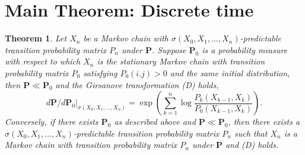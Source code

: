 \documentclass{lms}
\newtheorem{theorem}{Theorem}[section] %
\begin{document}
\section{Main Theorem: Discrete time}

\begin{theorem}
    Let $X_{n}$ be a Markov chain with $\sigma(X_{0},X_{1},\dots, X_{n})$-predictable transition probability matrix $P_n$ under $\mathbf P$. Suppose $\mathbf{P}_{0}$ is a probability measure with respect to which $X_{n}$ is the stationary Markov chain with transition probability matrix $P_0$ satisfying $P_{0}(i.j) >0$ and the same initial distribution, then $\mathbf{P} \ll \mathbf{P}_{0}$ and the Girsanove transformation (D) holds,
    \begin{equation*}   \left.d\mathbf{P}/d\mathbf{P}_{0}\right|_{\sigma(X_{0},X_{1},\dots, X_{n})}=  %
    \exp\left(\sum_{k=1}^{n} \log \frac{P_{k}(X_{k-1},X_{k})}{P_{0}(X_{k-1},X_{k})}
    \right). \tag{D}    \end{equation*}
    Conversely, if there exists $\mathbf{P}_{0}$ as described above and $\mathbf{P}\ll \mathbf{P}_{0}$, then there exists a $\sigma(X_{0},X_{1},\dots,X_{n})$-predictable transition probability matrix $P_n$ such that $X_n$ is a Markov chain with transition probability matrix $P_n$ under $\mathbf P$ and (D) holds. 
\end{theorem}
\end{document}

